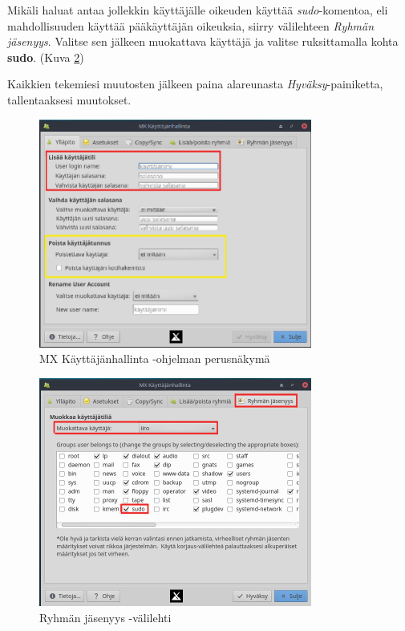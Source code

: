 \documentclass[a4paper, 12pt, finnish]{article}
\begin{document}
Mikäli haluat antaa jollekkin käyttäjälle oikeuden käyttää \textit{sudo}-komentoa, eli mahdollisuuden käyttää pääkäyttäjän oikeuksia, siirry välilehteen \textit{Ryhmän jäsenyys}. Valitse sen jälkeen muokattava käyttäjä ja valitse ruksittamalla kohta \textbf{sudo}. (Kuva \ref{fig:group})

Kaikkien tekemiesi muutosten jälkeen paina alareunasta \textit{Hyväksy}-painiketta, tallentaaksesi muutokset.

\begin{figure}[htpb]
    \begin{center}
        \includegraphics[width=0.8\textwidth]{user/nakyma}
        \caption{MX Käyttäjänhallinta -ohjelman perusnäkymä}
        \label{fig:usernak}
    \end{center}
\end{figure}   
\begin{figure}[htpb]
    \begin{center}
        \includegraphics[width=0.8\textwidth]{user/group}
        \caption{Ryhmän jäsenyys -välilehti}
        \label{fig:group}
    \end{center}
\end{figure}   
\end{document}
